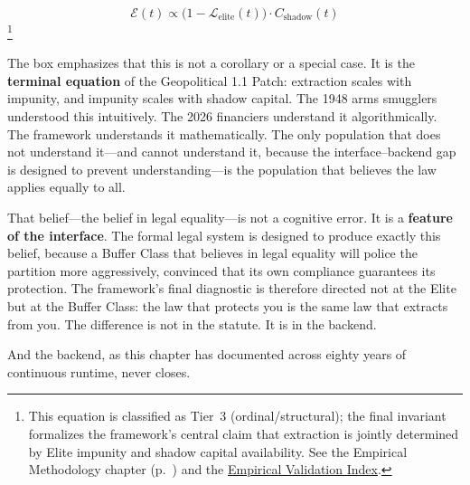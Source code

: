 \begin{equation}\label{eq:gp17-final-invariant}
\boxed{\mathcal{E}(t) \propto \bigl(1 - \mathcal{L}_{\text{elite}}(t)\bigr) \cdot C_{\text{shadow}}(t)}
\end{equation}
\footnote{This equation is classified as Tier~3 (ordinal/structural); the final invariant formalizes the framework's central claim that extraction is jointly determined by Elite impunity and shadow capital availability. See the Empirical Methodology chapter (p.~\pageref{ch:empirical_methodology}) and the \hyperref[app:empirical_index]{Empirical Validation Index}.}

The box emphasizes that this is not a corollary or a special case. It is the \textbf{terminal equation} of the Geopolitical 1.1 Patch: extraction scales with impunity, and impunity scales with shadow capital. The 1948 arms smugglers understood this intuitively. The 2026 financiers understand it algorithmically. The framework understands it mathematically. The only population that does not understand it---and cannot understand it, because the interface--backend gap is designed to prevent understanding---is the population that believes the law applies equally to all.

That belief---the belief in legal equality---is not a cognitive error. It is a \textbf{feature of the interface}. The formal legal system is designed to produce exactly this belief, because a Buffer Class that believes in legal equality will police the partition more aggressively, convinced that its own compliance guarantees its protection. The framework's final diagnostic is therefore directed not at the Elite but at the Buffer Class: the law that protects you is the same law that extracts from you. The difference is not in the statute. It is in the backend.

And the backend, as this chapter has documented across eighty years of continuous runtime, never closes.

